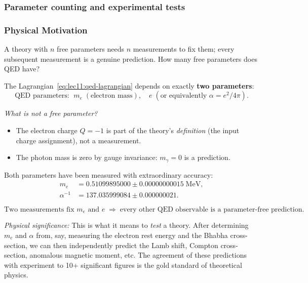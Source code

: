 \documentclass[../main.tex]{subfiles}
\begin{document}
\subsubsection*{Parameter counting and experimental tests}

\subsubsection*{Physical Motivation}

A theory with $n$ free parameters needs $n$ measurements to fix them; every subsequent measurement is a genuine prediction.  How many free parameters does QED have?

The Lagrangian~\eqref{eq:lec11:qed-lagrangian} depends on exactly \textbf{two parameters}:
\begin{equation}
  \boxed{
  \text{QED parameters: }\;
  m_e \;(\text{electron mass}),\quad
  e \;(\text{or equivalently }\alpha = e^2/4\pi).}
  \label{eq:lec11:qed-params}
\end{equation}

\textit{What is not a free parameter?}
\begin{itemize}
  \item The electron charge $Q=-1$ is part of the theory's \emph{definition} (the input charge assignment), not a measurement.
  \item The photon mass is zero by gauge invariance: $m_\gamma = 0$ is a prediction.
\end{itemize}

Both parameters have been measured with extraordinary accuracy:
\begin{align}
  m_e &= 0.51099895000 \pm 0.00000000015\;\text{MeV},
  \label{eq:lec11:me-value}\\[3pt]
  \alpha^{-1} &= 137.035999084 \pm 0.000000021.
  \label{eq:lec11:alpha-value}
\end{align}

\begin{equation}
  \boxed{
  \text{Two measurements fix }m_e\text{ and }e
  \;\Longrightarrow\;
  \text{every other QED observable is a parameter-free prediction.}}
  \label{eq:lec11:qed-prediction}
\end{equation}

\textit{Physical significance:} This is what it means to \emph{test} a theory.  After determining $m_e$ and $\alpha$ from, say, measuring the electron rest energy and the Bhabha cross-section, we can then independently predict the Lamb shift, Compton cross-section, anomalous magnetic moment, etc.  The agreement of these predictions with experiment to 10+ significant figures is the gold standard of theoretical physics.
\end{document}
